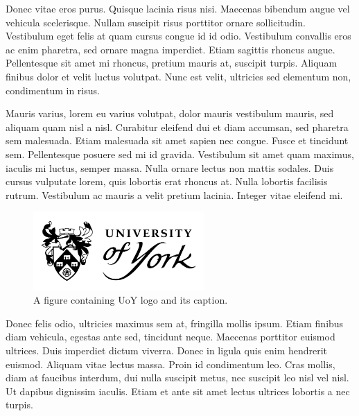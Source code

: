 \documentclass{UoYCSproject}
\begin{document}
Donec vitae eros purus. Quisque lacinia risus nisi. Maecenas bibendum
augue vel vehicula scelerisque. Nullam suscipit risus porttitor ornare
sollicitudin. Vestibulum eget felis at quam cursus congue id id
odio. Vestibulum convallis eros ac enim pharetra, sed ornare magna
imperdiet. Etiam sagittis rhoncus augue. Pellentesque sit amet mi
rhoncus, pretium mauris at, suscipit turpis. Aliquam finibus dolor et
velit luctus volutpat. Nunc est velit, ultricies sed elementum non,
condimentum in risus.

Mauris varius, lorem eu varius volutpat, dolor mauris vestibulum
mauris, sed aliquam quam nisl a nisl. Curabitur eleifend dui et diam
accumsan, sed pharetra sem malesuada. Etiam malesuada sit amet sapien
nec congue. Fusce et tincidunt sem. Pellentesque posuere sed mi id
gravida. Vestibulum sit amet quam maximus, iaculis mi luctus, semper
massa. Nulla ornare lectus non mattis sodales. Duis cursus vulputate
lorem, quis lobortis erat rhoncus at. Nulla lobortis facilisis
rutrum. Vestibulum ac mauris a velit pretium lacinia. Integer vitae
eleifend mi.

\begin{figure}[htb]
\begin{center}
\includegraphics[height=3cm]{"./UOY-Logo-Stacked-shield-Black"}
\end{center}
\caption{A figure containing UoY logo and its caption.}
\end{figure}

Donec felis odio, ultricies maximus sem at, fringilla mollis
ipsum. Etiam finibus diam vehicula, egestas ante sed, tincidunt
neque. Maecenas porttitor euismod ultrices. Duis imperdiet dictum
viverra. Donec in ligula quis enim hendrerit euismod. Aliquam vitae
lectus massa. Proin id condimentum leo. Cras mollis, diam at faucibus
interdum, dui nulla suscipit metus, nec suscipit leo nisl vel nisl. Ut
dapibus dignissim iaculis. Etiam et ante sit amet lectus ultrices
lobortis a nec turpis.
\end{document}

